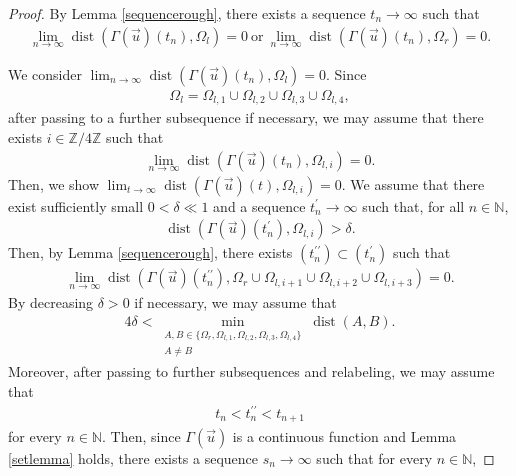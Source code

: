 \documentclass[reqno]{amsart}
\theoremstyle{plain}
\theoremstyle{definition}
\numberwithin{equation}{section}
\begin{document}
\begin{proof}
By Lemma \ref{sequencerough}, there exists a sequence $t_n\to\infty$ such that 
\begin{align*}
\lim_{n\to\infty}\operatorname{dist}\left(\Gamma(\vec{u})(t_n),\Omega_l\right)=0\ \mbox{or}\ \lim_{n\to\infty}\operatorname{dist}\left(\Gamma(\vec{u})(t_n),\Omega_r\right)=0. 
\end{align*}

We consider $\lim_{n\to\infty}\operatorname{dist}\left(\Gamma(\vec{u})(t_n),\Omega_l\right)=0$. Since
\begin{align*}
\Omega_l=\Omega_{l,1}\cup\Omega_{l,2}\cup\Omega_{l,3}\cup\Omega_{l,4},
\end{align*}
after passing to a further subsequence if necessary, we may assume that there exists $i\in\mathbb{Z}/4\mathbb{Z}$ such that
\begin{align*}
\lim_{n\to\infty}\operatorname{dist}\left(\Gamma(\vec{u})(t_n),\Omega_{l,i}\right)=0.
\end{align*}
Then, we show $\lim_{t\to\infty}\operatorname{dist}\left(\Gamma(\vec{u})(t),\Omega_{l,i}\right)=0$. We assume that there exist sufficiently small $0<\delta\ll 1$ and a sequence $t_n^{\prime}\to \infty$ such that, for all $n\in\mathbb{N}$,
\begin{align*}
\operatorname{dist}\left(\Gamma(\vec{u})(t_n^{\prime}),\Omega_{l,i}\right)>\delta.
\end{align*}
Then, by Lemma \ref{sequencerough}, there exists $(t_n^{\prime \prime})\subset (t_n^{\prime})$ such that 
\begin{align*}
\lim_{n\to\infty}\operatorname{dist}\left(\Gamma(\vec{u})(t_n^{\prime \prime}),\Omega_r\cup \Omega_{l,i+1}\cup \Omega_{l,i+2}\cup \Omega_{l,i+3} \right)=0.
\end{align*}
By decreasing $\delta>0$ if necessary, we may assume that
\begin{align*}
4\delta<\min_{\substack{A,B\in\{\Omega_r,\Omega_{l,1},\Omega_{l,2},\Omega_{l,3},\Omega_{l,4}\}
\\
A\neq B}}\operatorname{dist}(A,B).
\end{align*}
Moreover, after passing to further subsequences and relabeling, we may
assume that
\begin{align*}
t_n<t_n^{\prime\prime}<t_{n+1}
\end{align*}
for every $n\in\mathbb{N}$. Then, since $\Gamma(\vec{u})$ is a continuous function and Lemma \ref{setlemma} holds, there exists a sequence $s_n\to \infty$ such that for every $n\in\mathbb{N}$,

\end{proof}
\end{document}
